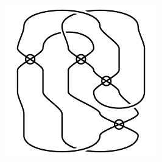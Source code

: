 \begin{figure}[H]
\begin{minipage}[b]{.18\linewidth}
\end{minipage}
\begin{minipage}[b]{.18\linewidth}
\centering
\includegraphics[width=\linewidth]{../data/virtual_4_11.png}
\end{minipage}
\end{figure}

